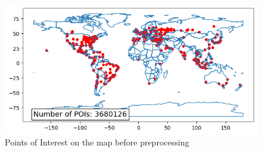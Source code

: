 \documentclass[twocolumn]{article}
\begin{document}
 \begin{figure}
  \centering
  \includegraphics[width=1\linewidth]{poi_original.png}
  \caption{Points of Interest on the map before preprocessing}
  \label{fig:data}
\end{figure}
\end{document}
